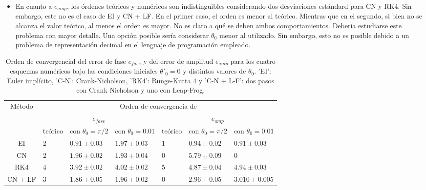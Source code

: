 \documentclass[aps,prb,twocolumn,superscriptaddress,floatfix,longbibliography]{revtex4-2}
\newcounter{para}
\begin{document}
\begin{itemize}
  \item En cuanto a $e_{amp}$, los órdenes teóricos y numéricos son indistinguibles considerando dos desviaciones estándard para CN y RK4. Sin embargo, este no es el caso de EI y CN + LF. En el primer caso, el orden es menor al teórico. Mientras que en el segundo, si bien no se alcanza el valor teórico, al menos el orden es mayor. No es claro a qué se deben ambos comportamientos. Debería estudiarse este problema con mayor detalle. Una opción posible sería considerar $\theta_0$ menor al utilizado. Sin embargo, esto no es posible debido a un problema de representación decimal en el lenguaje de programación empleado.
\end{itemize}





\onecolumngrid

\begin{table}[]
  \begin{tabular}{|c|llllll|}
  \hline
  \multirow{3}{*}{Método} &
    \multicolumn{6}{c|}{Orden de convergencia de} \\ \cline{2-7} 
   &
    \multicolumn{3}{c|}{$e_{fase}$} &
    \multicolumn{3}{c|}{$e_{amp}$} \\ \cline{2-7} 
   &
    \multicolumn{1}{c|}{teórico} &
    \multicolumn{1}{c|}{con $\theta_0 = \pi/2$} &
    \multicolumn{1}{c|}{con $\theta_0 = 0.01$} &
    \multicolumn{1}{c|}{teórico} &
    \multicolumn{1}{c|}{con $\theta_0 = \pi/2$} &
    \multicolumn{1}{c|}{con $\theta_0 = 0.01$} \\ \hline
  EI &
    \multicolumn{1}{l|}{2} &
    \multicolumn{1}{l|}{$0.91 \pm 0.03$} &
    \multicolumn{1}{l|}{$1.97 \pm 0.03$} &
    \multicolumn{1}{l|}{1} &
    \multicolumn{1}{l|}{$0.94 \pm 0.02$} &
    $0.91 \pm 0.03$ \\ \hline
  CN &
    \multicolumn{1}{l|}{2} &
    \multicolumn{1}{l|}{$1.96 \pm 0.02$} &
    \multicolumn{1}{l|}{$1.93 \pm 0.04$} &
    \multicolumn{1}{l|}{0} &
    \multicolumn{1}{l|}{$5.79 \pm 0.09$} &
    0 \\ \hline
  RK4 &
    \multicolumn{1}{l|}{4} &
    \multicolumn{1}{l|}{$3.92 \pm 0.02$} &
    \multicolumn{1}{l|}{$4.02 \pm 0.02$} &
    \multicolumn{1}{l|}{5} &
    \multicolumn{1}{l|}{$4.87 \pm 0.04$} &
    $4.94 \pm 0.03$ \\ \hline
  CN + LF &
    \multicolumn{1}{l|}{3} &
    \multicolumn{1}{l|}{$1.86 \pm 0.05$} &
    \multicolumn{1}{l|}{$1.96 \pm 0.02$} &
    \multicolumn{1}{l|}{0} &
    \multicolumn{1}{l|}{$2.96 \pm 0.05$} &
    $3.010 \pm 0.005$ \\ \hline
  \end{tabular}
  \caption{\label{tabla:simple_errores} Orden de convergencial del error de fase $e_{fase}$ y del error de amplitud $e_{amp}$ para los cuatro esquemas numéricos bajo las condiciones iniciales $\theta'_0 = 0$ y distintos valores de $\theta_0$. 'EI': Euler implícito, 'C-N': Crank-Nicholson, 'RK4': Runge-Kutta 4 y 'C-N + L-F': dos pasos con Crank Nicholson y uno con Leap-Frog.}
  \end{table}
\end{document}
